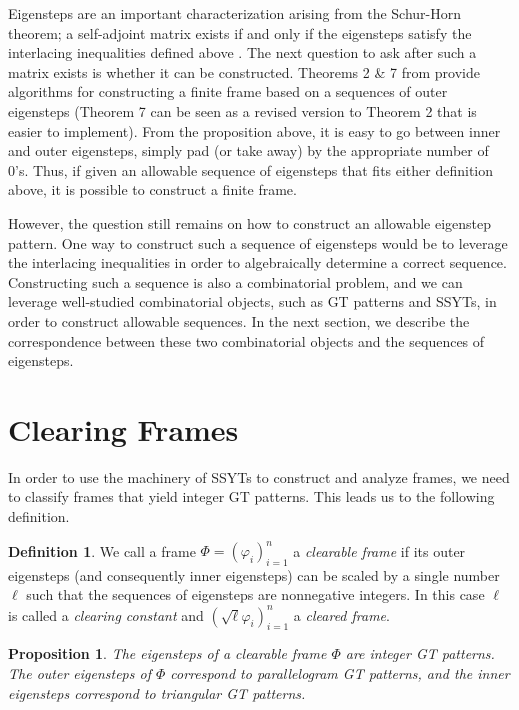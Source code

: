 \documentclass[10pt]{article}
\theoremstyle{plain}
\newtheorem{prop}[thm]{Proposition}
\theoremstyle{definition}
\newtheorem{definition}[thm]{Definition}
\renewcommand{\phi}{\varphi}
\begin{document}
Eigensteps are an important characterization arising from the Schur-Horn theorem; a self-adjoint matrix exists if and only if the eigensteps satisfy the interlacing inequalities defined above \cite{Schurbackground, Hornbackground}. The next question to ask after such a matrix exists is whether it can be constructed. Theorems 2 \& 7 from \cite{cfmconstructingfiniteframes} provide algorithms for constructing a finite frame based on a sequences of outer eigensteps (Theorem 7 can be seen as a revised version to Theorem 2 that is easier to implement). From the proposition above, it is easy to go between inner and outer eigensteps, simply pad (or take away) by the appropriate number of 0's. Thus, if given an allowable sequence of eigensteps that fits either definition above, it is possible to construct a finite frame. 

However, the question still remains on how to construct an allowable eigenstep pattern. One way to construct such a sequence of eigensteps would be to leverage the interlacing inequalities in order to algebraically determine a correct sequence. Constructing such a sequence is also a combinatorial problem, and we can leverage well-studied combinatorial objects, such as GT patterns and SSYTs, in order to construct allowable sequences. In the next section, we describe the correspondence between these two combinatorial objects and the sequences of eigensteps.

\section{Clearing Frames}\label{semistandardframes}
In order to use the machinery of SSYTs to construct and analyze frames, we need to classify frames that yield integer GT patterns.  This leads us to the following definition.

\begin{definition}
We call a frame $\Phi = (\phi_i)^n_{i=1}$ a \emph{clearable frame} if its outer eigensteps (and consequently inner eigensteps) can be scaled by a single number $\ell$ such that the sequences of eigensteps are nonnegative integers. In this case $\ell$ is called a \emph{clearing constant} and $(\sqrt{\ell}\phi_i)^n_{i=1}$ a \emph{cleared frame}.
\end{definition}

\begin{prop}\label{prop:clear2GT}
The eigensteps of a clearable frame $\Phi$ are integer GT patterns. The outer eigensteps of $\Phi$ correspond to parallelogram GT patterns, and the inner eigensteps correspond to triangular GT patterns.
\end{prop}
\end{document}
